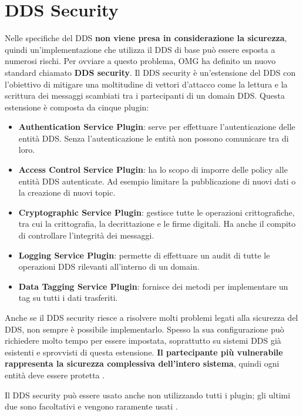 \section{DDS Security}
Nelle specifiche del DDS 
\textbf{non viene presa in considerazione la sicurezza}, quindi
un'implementazione che utilizza il DDS di base può essere esposta a numerosi 
rischi. Per ovviare a questo problema, OMG ha definito un nuovo standard 
chiamato \textbf{DDS security}. Il DDS security è un'estensione del DDS con 
l'obiettivo di mitigare una moltitudine di vettori d'attacco come 
la lettura e la scrittura dei messaggi scambiati tra i partecipanti di un 
domain DDS. Questa estensione è composta da cinque plugin:
\begin{itemize}
    \item \textbf{Authentication Service Plugin}: serve per effettuare l'autenticazione 
    delle entità DDS. Senza l'autenticazione le entità non possono
    comunicare tra di loro.
    \item \textbf{Access Control Service Plugin}: ha lo scopo di imporre 
    delle policy alle entità DDS autenticate. Ad esempio limitare
    la pubblicazione di nuovi dati o la creazione di nuovi topic.
    \item \textbf{Cryptographic Service Plugin}: gestisce tutte le operazioni 
    crittografiche, tra cui la crittografia, la decrittazione e
    le firme digitali. Ha anche il compito di controllare l'integrità
    dei messaggi.
    \item \textbf{Logging Service Plugin}: permette di effettuare un audit di 
    tutte le operazioni DDS rilevanti all'interno di un domain.
    \item \textbf{Data Tagging Service Plugin}: fornisce dei metodi per implementare
    un tag su tutti i dati trasferiti. 
\end{itemize}
Anche se il DDS security riesce a risolvere molti problemi legati alla
sicurezza del DDS, non sempre è possibile implementarlo. Spesso 
la sua configurazione può richiedere molto tempo per essere 
impostata, soprattutto su sistemi DDS già esistenti e sprovvisti di 
questa estensione.
\textbf{Il partecipante più vulnerabile rappresenta la sicurezza
complessiva dell'intero sistema}, quindi ogni entità deve essere
protetta \cite{Michaud2017Apr}. 

Il DDS security può essere usato anche non utilizzando tutti i plugin;
gli ultimi due sono facoltativi e vengono 
raramente usati \cite{essay93639}. 
\label{DDS Security}


